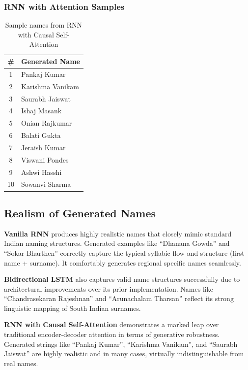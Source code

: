 \documentclass[11pt,a4paper]{article}
\begin{document}
\subsubsection{RNN with Attention Samples}
\begin{table}[H]
\centering
\caption{Sample names from RNN with Causal Self-Attention}
\renewcommand{\arraystretch}{1.3}
\begin{tabularx}{\textwidth}{cX}
\toprule
\textbf{\#} & \textbf{Generated Name} \\
\midrule
1 & Pankaj Kumar \\
2 & Karishma Vanikam \\
3 & Saurabh Jaiswat \\
4 & Ishaj Masank \\
5 & Onian Rajkumar \\
6 & Balati Gukta \\
7 & Jeraish Kumar \\
8 & Viswani Pondes \\
9 & Ashwi Hasshi \\
10 & Sowanvi Sharma \\
\bottomrule
\end{tabularx}
\end{table}

\subsection{Realism of Generated Names}

\textbf{Vanilla RNN} produces highly realistic names that closely mimic standard Indian naming structures. Generated examples like ``Dhanana Gowda'' and ``Sokar Bharthen'' correctly capture the typical syllabic flow and structure (first name + surname). It comfortably generates regional specific names seamlessly.

\textbf{Bidirectional LSTM} also captures valid name structures successfully due to architectural improvements over its prior implementation. Names like ``Chandrasekaran Rajeshnan'' and ``Arunachalam Tharsan'' reflect its strong linguistic mapping of South Indian surnames. 

\textbf{RNN with Causal Self-Attention} demonstrates a marked leap over traditional encoder-decoder attention in terms of generative robustness. Generated strings like ``Pankaj Kumar'', ``Karishma Vanikam'', and ``Saurabh Jaiswat'' are highly realistic and in many cases, virtually indistinguishable from real names.
\end{document}
